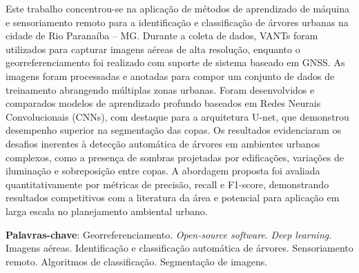 \documentclass[
    12pt,
    openright,
    oneside,
    a4paper,
    sumario=tradicional,
    english,
    brazil,
    ]{abntex2}
\begin{document}
\begin{resumo}
 \noindent
Este trabalho concentrou-se na aplicação de métodos de aprendizado de máquina e sensoriamento remoto para a identificação e classificação de árvores urbanas na cidade de Rio Paranaíba -- MG. Durante a coleta de dados, VANTs foram utilizados para capturar imagens aéreas de alta resolução, enquanto o georreferenciamento foi realizado com suporte de sistema baseado em GNSS. As imagens foram processadas e anotadas para compor um conjunto de dados de treinamento abrangendo múltiplas zonas urbanas. Foram desenvolvidos e comparados modelos de aprendizado profundo baseados em Redes Neurais Convolucionais (CNNs), com destaque para a arquitetura U-net, que demonstrou desempenho superior na segmentação das copas. Os resultados evidenciaram os desafios inerentes à detecção automática de árvores em ambientes urbanos complexos, como a presença de sombras projetadas por edificações, variações de iluminação e sobreposição entre copas. A abordagem proposta foi avaliada quantitativamente por métricas de precisão, recall e F1-score, demonstrando resultados competitivos com a literatura da área e potencial para aplicação em larga escala no planejamento ambiental urbano.
 \vspace{\onelineskip}

 \noindent
 \textbf{Palavras-chave}: Georreferenciamento. \textit{Open-source software}. \textit{Deep learning}. Imagens aéreas. Identificação e classificação automática de árvores. Sensoriamento remoto. Algoritmos de classificação. Segmentação de imagens.
\end{resumo}
\end{document}
